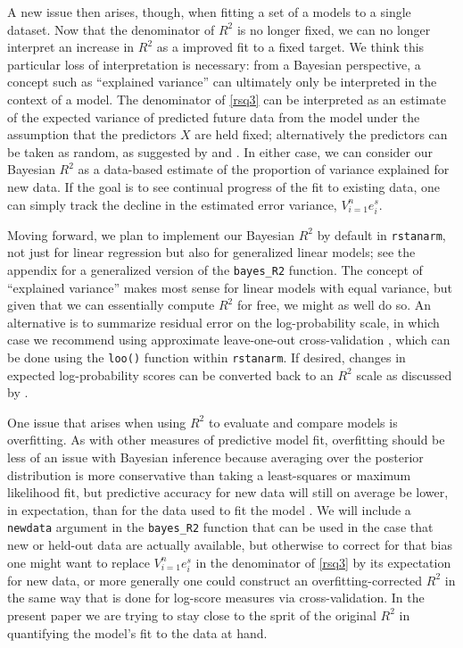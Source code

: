 \documentclass[11pt]{article}
\begin{document}
A new issue then arises, though, when fitting a set of a models to a single
dataset.  Now that the denominator of $R^2$ is no longer fixed, we can no longer
interpret an increase in $R^2$ as a improved fit to a fixed target.  We think
this particular loss of interpretation is necessary:  from a Bayesian
perspective, a concept such as ``explained variance'' can ultimately only be
interpreted in the context of a model.  The denominator of \eqref{rsq3} can be
interpreted as an estimate of the expected variance of predicted future data
from the model under the assumption that the predictors $X$ are held fixed;
alternatively the predictors can be taken as random, as suggested by \cite{Helland1987} 
and \cite{Tjur2009}.  In either case, we can consider our Bayesian $R^2$ as a
data-based estimate of the proportion of variance explained for new data. If the
goal is to see continual progress of the fit to existing data, one can simply
track the decline in the estimated error variance, $V_{i=1}^n e_i^s$.

Moving forward, we plan to implement our Bayesian $R^2$ by default in
{\tt rstanarm}, not just for linear regression but also for generalized linear
models; see the appendix for a generalized version of the
\verb#bayes_R2# function. The concept of ``explained variance'' makes most
sense for linear models with equal variance, but given that we can essentially
compute $R^2$ for free, we might as well do so.  An alternative is to summarize
residual error on the log-probability scale, in which case we recommend using
approximate leave-one-out cross-validation \citep{VehtariGelmanGabry2017},
which can be done using the {\tt loo()} function within {\tt rstanarm}.   If
desired, changes in expected log-probability scores can be converted back to an
$R^2$ scale as discussed by \cite{Nagelkerke1991}.

One issue that arises when using $R^2$ to evaluate and compare models is
overfitting.  As with other measures of predictive model fit, overfitting should
be less of an issue with Bayesian inference because averaging over the posterior
distribution is more conservative than taking a least-squares or maximum
likelihood fit, but predictive accuracy for new data will still on average be
lower, in expectation, than for the data used to fit the model \citep{GelmanHwangVehtari2014}.  
We will include a {\tt newdata} argument in the \verb#bayes_R2# 
function  that can be used in the case that new or held-out data are actually 
available, but otherwise to correct for that bias one might want to replace
$V_{i=1}^n e_i^s$ in the denominator of \eqref{rsq3} by its expectation for new
data, or more generally one could construct an overfitting-corrected $R^2$ in
the same way that is done for log-score measures via cross-validation. 
In the present paper we are trying to stay close to the sprit of the original $R^2$ in
quantifying the model's fit to the data at hand.
\end{document}

